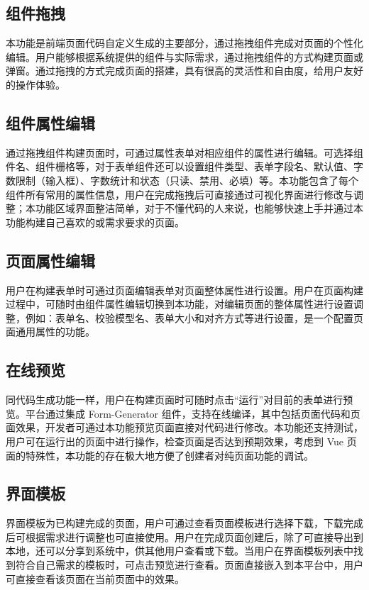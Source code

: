 \documentclass{izdthesis}
\begin{document}
\subsection{组件拖拽}
本功能是前端页面代码自定义生成的主要部分，通过拖拽组件完成对页面的个性化编辑。用户能够根据系统提供的组件与实际需求，通过拖拽组件的方式构建页面或弹窗。通过拖拽的方式完成页面的搭建，具有很高的灵活性和自由度，给用户友好的操作体验。

\subsection{组件属性编辑}
通过拖拽组件构建页面时，可通过属性表单对相应组件的属性进行编辑。可选择组件名、组件栅格等，对于表单组件还可以设置组件类型、表单字段名、默认值、字数限制（输入框）、字数统计和状态（只读、禁用、必填）等。本功能包含了每个组件所有常用的属性信息，用户在完成拖拽后可直接通过可视化界面进行修改与调整；本功能区域界面整洁简单，对于不懂代码的人来说，也能够快速上手并通过本功能构建自己喜欢的或需求要求的页面。

\subsection{页面属性编辑}
用户在构建表单时可通过页面编辑表单对页面整体属性进行设置。用户在页面构建过程中，可随时由组件属性编辑切换到本功能，对编辑页面的整体属性进行设置调整，例如：表单名、校验模型名、表单大小和对齐方式等进行设置，是一个配置页面通用属性的功能。

\subsection{在线预览}
同代码生成功能一样，用户在构建页面时可随时点击“运行”对目前的表单进行预览。平台通过集成 Form-Generator 组件，支持在线编译，其中包括页面代码和页面效果，开发者可通过本功能预览页面直接对代码进行修改。本功能还支持测试，用户可在运行出的页面中进行操作，检查页面是否达到预期效果，考虑到 Vue 页面的特殊性，本功能的存在极大地方便了创建者对纯页面功能的调试。

\subsection{界面模板}
界面模板为已构建完成的页面，用户可通过查看页面模板进行选择下载，下载完成后可根据需求进行调整也可直接使用。用户在完成页面创建后，除了可直接导出到本地，还可以分享到系统中，供其他用户查看或下载。当用户在界面模板列表中找到符合自己需求的模板时，可点击预览进行查看。页面直接嵌入到本平台中，用户可直接查看该页面在当前页面中的效果。
\end{document}
